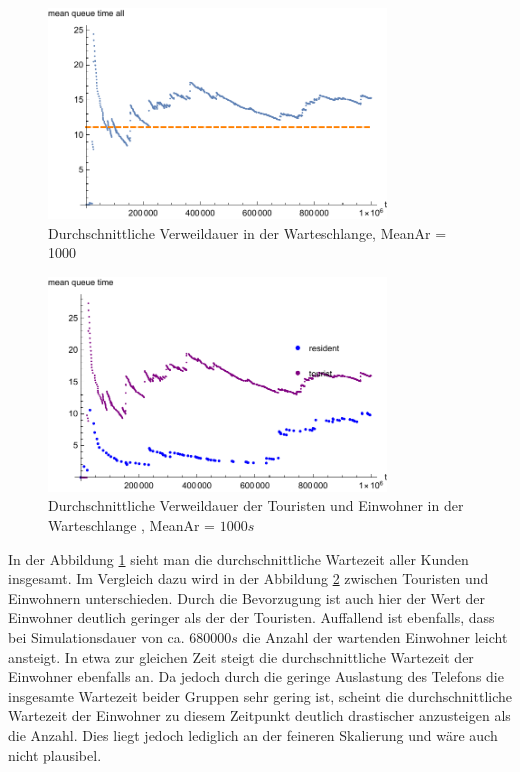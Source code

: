 \begin{figure}[htpb]
	\centering
	\includegraphics[width=0.8\textwidth]{abbildungen/1_Phone_VIP/Arrival_1000_Serve_100_dur_1000000_Skip_0/MeanQueueTimeAll.pdf}
	\caption{Durchschnittliche Verweildauer in der Warteschlange, MeanAr = 1000}
	\label{fig:MQTVIP1000ALL}
\end{figure} 

\begin{figure}[htpb]
	\centering
	\includegraphics[width=0.8\textwidth]{abbildungen/1_Phone_VIP/Arrival_1000_Serve_100_dur_1000000_Skip_0/MeanQueueTimeTouristAndResident.pdf}
	\caption{Durchschnittliche Verweildauer der Touristen und Einwohner in der Warteschlange , MeanAr = $1000s$}
	\label{fig:MQTVIP1000VGL}
\end{figure}

In der Abbildung \ref{fig:MQTVIP1000ALL} sieht man die durchschnittliche Wartezeit aller Kunden insgesamt. Im Vergleich dazu wird in der Abbildung \ref{fig:MQTVIP1000VGL} zwischen Touristen und Einwohnern unterschieden. Durch die Bevorzugung ist auch hier der Wert der Einwohner deutlich geringer als der der Touristen. Auffallend ist ebenfalls, dass bei Simulationsdauer von ca. $680000s$ die Anzahl der wartenden Einwohner leicht ansteigt. In etwa zur gleichen Zeit steigt die durchschnittliche Wartezeit der Einwohner ebenfalls an. Da jedoch durch die geringe Auslastung des Telefons die insgesamte Wartezeit beider Gruppen sehr gering ist, scheint die durchschnittliche Wartezeit der Einwohner zu diesem Zeitpunkt deutlich drastischer anzusteigen als die Anzahl. Dies liegt jedoch lediglich an der feineren Skalierung und wäre auch nicht plausibel. 

